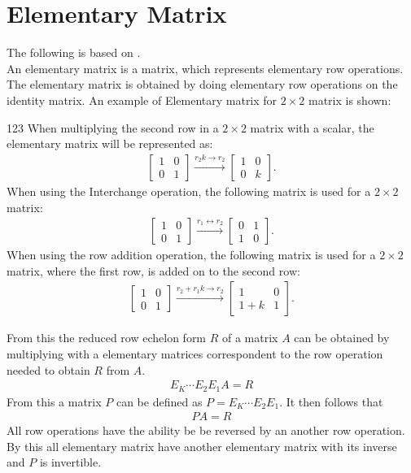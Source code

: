 \chapter{Elementary Matrix}\label{bil:ElementaryMatrix}
The following is based on \cite[126-127]{LiAl}.\\
An elementary matrix is a matrix, which represents elementary row operations. The elementary matrix is obtained by doing elementary row operations on the identity matrix. An example of Elementary matrix for $2\times 2$ matrix is shown:
\begin{example}{123}
 When multiplying the second row in a $2 \times 2$ matrix with a scalar, the elementary matrix will be represented as:
\begin{align*}
    \begin{bmatrix}
    1 & 0\\
    0 & 1
    \end{bmatrix}
    \xrightarrow{r_2k\rightarrow r_2}
    \begin{bmatrix}
    1 & 0\\
    0 & k
    \end{bmatrix}.
\end{align*}
When using the Interchange operation, the following matrix is used for a $2\times 2$ matrix:
\begin{align*}
    \begin{bmatrix}
    1 & 0\\
    0 & 1
    \end{bmatrix}
    \xrightarrow{r_1\leftrightarrow r_2}
    \begin{bmatrix}
    0 & 1\\
    1 & 0
    \end{bmatrix}.
\end{align*}
When using the row addition operation, the following matrix is used for a $2\times 2$ matrix, where the first row, is added on to the second row:
\begin{align*}
    \begin{bmatrix}
    1 & 0\\
    0 & 1
    \end{bmatrix}
    \xrightarrow{r_2 + r_1k\rightarrow r_2}
    \begin{bmatrix}
        1 & 0\\
        1+k & 1
    \end{bmatrix}.
\end{align*}
\end{example}
From this the reduced row echelon form $R$ of a matrix $A$ can be obtained by multiplying with a elementary matrices correspondent to the row operation needed to obtain $R$ from $A$.
\begin{align*}
    E_K\cdots E_2E_1A=R
\end{align*}
From this a matrix $P$ can be defined as $P=E_K\cdots E_2E_1$. It then follows that
\begin{align*}
    PA=R
\end{align*}
All row operations have the ability be be reversed by an another row operation. By this all elementary matrix have another elementary matrix with its inverse and $P$ is invertible.  
